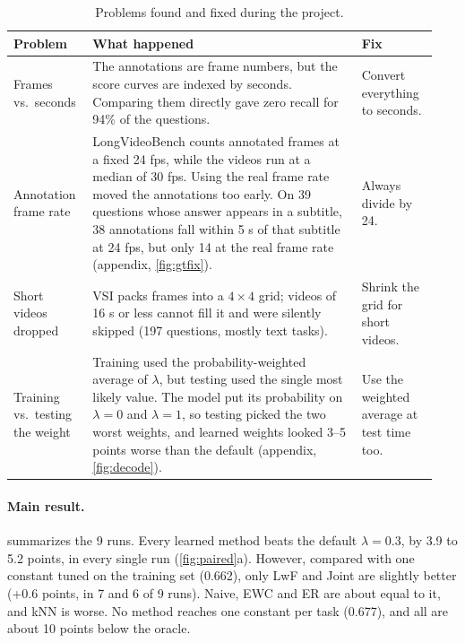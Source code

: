 \documentclass[10pt,twocolumn,letterpaper]{article}
\newcommand{\lam}{\lambda}
\begin{document}
\begin{table}[t]
  \centering
  \small
  \begin{tabular}{p{0.17\linewidth}p{0.6\linewidth}p{0.17\linewidth}}
    \toprule
    Problem & What happened & Fix \\
    \midrule
    Frames vs.\ seconds & The annotations are frame numbers, but the score curves are indexed by seconds. Comparing them directly gave zero recall for 94\% of the questions. & Convert everything to seconds. \\
    Annotation frame rate & LongVideoBench counts annotated frames at a fixed 24 fps, while the videos run at a median of 30 fps. Using the real frame rate moved the annotations too early. On 39 questions whose answer appears in a subtitle, 38 annotations fall within 5 s of that subtitle at 24 fps, but only 14 at the real frame rate (appendix, \cref{fig:gtfix}). & Always divide by 24. \\
    Short videos dropped & VSI packs frames into a $4\times4$ grid; videos of 16 s or less cannot fill it and were silently skipped (197 questions, mostly text tasks). & Shrink the grid for short videos. \\
    Training vs.\ testing the weight & Training used the probability-weighted average of $\lam$, but testing used the single most likely value. The model put its probability on $\lam=0$ and $\lam=1$, so testing picked the two worst weights, and learned weights looked 3--5 points worse than the default (appendix, \cref{fig:decode}). & Use the weighted average at test time too. \\
    \bottomrule
  \end{tabular}
  \caption{Problems found and fixed during the project.}
  \label{tab:pitfalls}
\end{table}

\paragraph{Main result.}
 summarizes the 9 runs.
Every learned method beats the default $\lam=0.3$, by 3.9 to 5.2 points, in every single run (\cref{fig:paired}a).
However, compared with one constant tuned on the training set (0.662), only LwF and Joint are slightly better (+0.6 points, in 7 and 6 of 9 runs).
Naive, EWC and ER are about equal to it, and kNN is worse.
No method reaches one constant per task (0.677), and all are about 10 points below the oracle.
\end{document}
